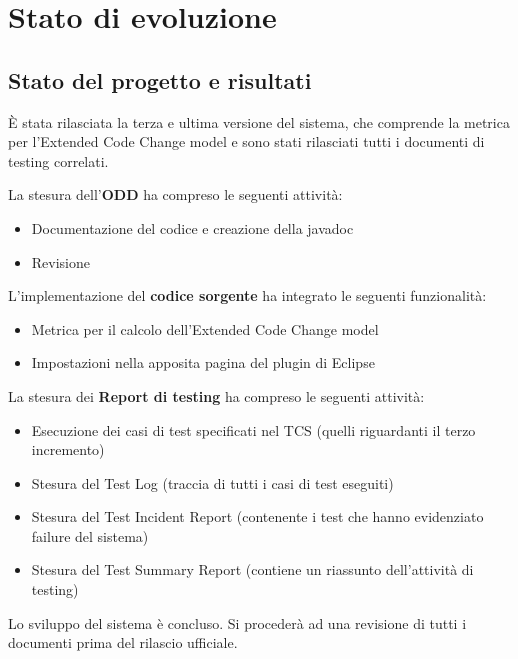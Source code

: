 \chapter{Stato di evoluzione}
\section{Stato del progetto e risultati}
È stata rilasciata la terza e ultima versione del sistema, che comprende la metrica per l'Extended Code Change model e sono stati rilasciati tutti i documenti di testing correlati.

\vspace{0.5cm}

{\setlength{\parindent}{0cm}
La stesura dell'\textbf{ODD} ha compreso le seguenti attività:
\begin{itemize}
 \item Documentazione del codice e creazione della javadoc
 \item Revisione
\end{itemize}
}

\vspace{0.5cm}

{\setlength{\parindent}{0cm}
L'implementazione del \textbf{codice sorgente} ha integrato le seguenti funzionalità:
\begin{itemize}
 \item Metrica per il calcolo dell'Extended Code Change model
 \item Impostazioni nella apposita pagina del plugin di Eclipse
\end{itemize}
}

\vspace{0.5cm}

{\setlength{\parindent}{0cm}
La stesura dei \textbf{Report di testing} ha compreso le seguenti attività:
\begin{itemize}
 \item Esecuzione dei casi di test specificati nel TCS (quelli riguardanti il terzo incremento)
 \item Stesura del Test Log (traccia di tutti i casi di test eseguiti)
 \item Stesura del Test Incident Report (contenente i test che hanno evidenziato failure del sistema)
 \item Stesura del Test Summary Report (contiene un riassunto dell'attività di testing)
\end{itemize}
}

Lo sviluppo del sistema è concluso. Si procederà ad una revisione di tutti i documenti prima del rilascio ufficiale.